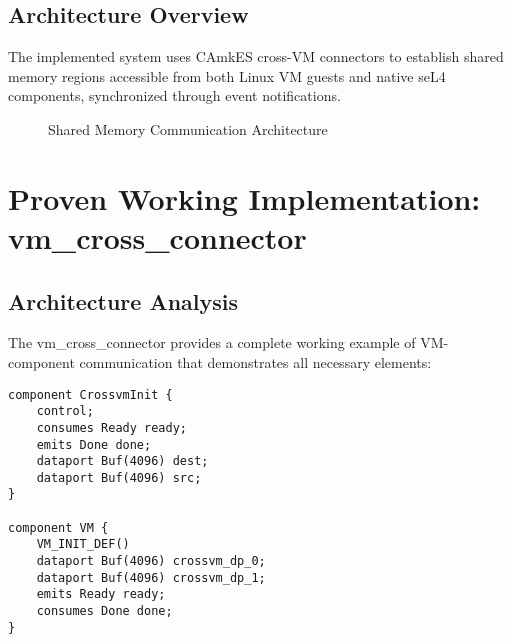 \documentclass[12pt,a4paper]{article}
\begin{document}
\subsection{Architecture Overview}

The implemented system uses CAmkES cross-VM connectors to establish shared memory regions accessible from both Linux VM guests and native seL4 components, synchronized through event notifications.

\begin{figure}[htbp]
\centering
{}
\caption{Shared Memory Communication Architecture}
\label{fig:sharedmemory}
\end{figure}

\section{Proven Working Implementation: vm\_cross\_connector}

\subsection{Architecture Analysis}

The vm\_cross\_connector provides a complete working example of VM-component communication that demonstrates all necessary elements:

\begin{lstlisting}[style=camkes, caption=vm\_cross\_connector component definitions]
component CrossvmInit {
    control;
    consumes Ready ready;
    emits Done done;
    dataport Buf(4096) dest;
    dataport Buf(4096) src;
}

component VM {
    VM_INIT_DEF()
    dataport Buf(4096) crossvm_dp_0;
    dataport Buf(4096) crossvm_dp_1;
    emits Ready ready;
    consumes Done done;
}
\end{lstlisting}
\end{document}
